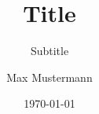 \author{Max Mustermann}
\titlehead{titlehead}
\subject{Subject}
\title{Title}
\subtitle{Subtitle}
\date{\today}
